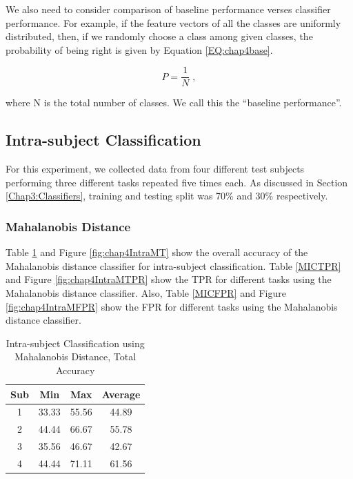     We also need to consider comparison of baseline performance verses classifier performance. For example, if the feature vectors of all the classes are uniformly distributed, then, if we randomly choose a class among given classes, the probability of being right is given by Equation \ref{EQ:chap4base}.

    	\begin{equation}
    		P =  \frac{1}{N} \;,
    		\label{EQ:chap4base}
    	\end{equation}

    	\noindent where N is the total number of classes. We call this the ``baseline performance''.

    \subsection{Intra-subject Classification}
    For this experiment, we collected data from four different test subjects performing three different tasks repeated five times each. As discussed in Section \ref{Chap3:Classifiers}, training and testing split was 70\% and 30\% respectively.
    
    \subsubsection{Mahalanobis Distance}
    Table \ref{MICT} and Figure \ref{fig:chap4IntraMT} show the overall accuracy of the Mahalanobis distance classifier for intra-subject classification. Table \ref{MICTPR} and Figure \ref{fig:chap4IntraMTPR} show the TPR for different tasks using the Mahalanobis distance classifier. Also, Table \ref{MICFPR} and Figure \ref{fig:chap4IntraMFPR} show the FPR for different tasks using the Mahalanobis distance classifier.
		\begin{table}[h!]
			\centering
			\caption{Intra-subject Classification using Mahalanobis Distance, Total Accuracy}
			\label{MICT}
			\begin{tabular}{c c c c}
				\hline
				Sub &Min &Max &Average\\\hline
				1 &33.33 &55.56 &44.89\\
				2 &44.44 &66.67 &55.78\\
				3 &35.56 &46.67 &42.67\\
				4 &44.44 &71.11 &61.56\\
			\end{tabular}
		\end{table}
        
